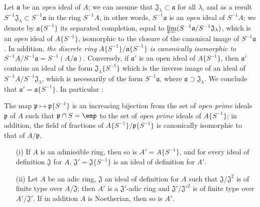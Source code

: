 \begin{env}[7.6.9]
\label{0.7.6.9}
Let $\mathfrak{a}$ be an \emph{open} ideal of $A$; we can assume that
$\mathfrak{J}_\lambda\subset\mathfrak{a}$ for all $\lambda$, and as a result
$S^{-1}\mathfrak{J}_\lambda\subset S^{-1}\mathfrak{a}$ in the ring $S^{-1}A$, in other words,
$S^{-1}\mathfrak{a}$ is an \emph{open} ideal of $S^{-1}A$; we denote by $\mathfrak{a}\{S^{-1}\}$ its
separated completion, equal to $\varprojlim(S^{-1}\mathfrak{a}/S^{-1}\mathfrak{J}_\lambda)$, which is
an \emph{open} ideal of $A\{S^{-1}\}$, isomorphic to the closure of the canonical image of
$S^{-1}\mathfrak{a}$. In addition, \emph{the discrete ring $A\{S^{-1}\}/\mathfrak{a}\{S^{-1}\}$ is
canonically isomorphic to $S^{-1}A/S^{-1}\mathfrak{a}=S^{-1}(A/\mathfrak{a})$}. Conversely, if
$\mathfrak{a}'$ is an open ideal of $A\{S^{-1}\}$, then $\mathfrak{a}'$ contains an ideal of the
form $\mathfrak{J}_\lambda\{S^{-1}\}$ which is the inverse image of an ideal of
$S^{-1}A/S^{-1}\mathfrak{J}_\lambda$, which is necessarily  of the
form $S^{-1}\mathfrak{a}$, where $\mathfrak{a}\supset\mathfrak{J}_\lambda$. We conclude that
$\mathfrak{a}'=\mathfrak{a}\{S^{-1}\}$. In particular :
\end{env}

\begin{proposition}[7.6.10]
\label{0.7.6.10}
The map $\mathfrak{p}\mapsto\mathfrak{p}\{S^{-1}\}$ is an increasing bijection from the set of
\emph{open prime} ideals $\mathfrak{p}$ of $A$ such that $\mathfrak{p}\cap S=\emp$ to the set
of \emph{open prime} ideals
of $A\{S^{-1}\}$; in addition, the field of fractions of $A\{S^{-1}\}/\mathfrak{p}\{S^{-1}\}$ is
canonically isomorphic to that of $A/\mathfrak{p}$.
\end{proposition}

\begin{proposition}[7.6.11]
\label{0.7.6.11}
\medskip\noindent
\begin{enumerate}
  \item[{\rm(i)}] If $A$ is an admissible ring, then so is $A'=A\{S^{-1}\}$, and for every ideal
    of definition $\mathfrak{J}$ for $A$, $\mathfrak{J}'=\mathfrak{J}\{S^{-1}\}$ is an ideal of
    definition for $A'$.
  \item[{\rm(ii)}] Let $A$ be an adic ring, $\mathfrak{J}$ an ideal of definition for $A$ such that
    $\mathfrak{J}/\mathfrak{J}^2$ is of finite type over $A/\mathfrak{J}$; then $A'$ is a
    $\mathfrak{J}'$-adic ring and $\mathfrak{J}'/{\mathfrak{J}'}^2$ is of finite type over
    $A'/\mathfrak{J}'$. If in addition $A$ is Noetherian, then so is $A'$.
\end{enumerate}
\end{proposition}

